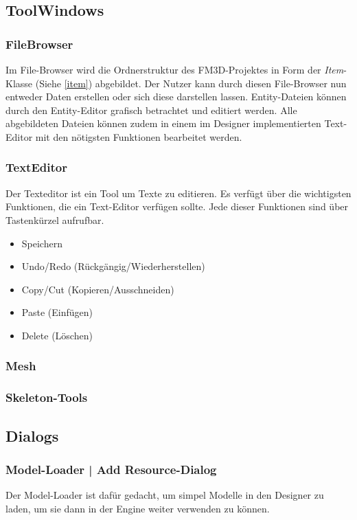 \subsection{ToolWindows}
\subsubsection{FileBrowser}
\label{filebrowser}
Im File-Browser wird die Ordnerstruktur des FM3D-Projektes in Form der \textit{Item}-Klasse (Siehe \cref{item}) abgebildet. Der Nutzer kann durch diesen File-Browser nun entweder Daten erstellen oder sich diese darstellen lassen. Entity-Dateien können durch den Entity-Editor grafisch betrachtet und editiert werden. Alle abgebildeten Dateien können zudem in einem im Designer implementierten Text-Editor mit den nötigsten Funktionen bearbeitet werden.

\subsubsection{TextEditor}
Der Texteditor ist ein Tool um Texte zu editieren.  Es verfügt über die wichtigsten Funktionen, die ein Text-Editor verfügen sollte. Jede dieser Funktionen sind über Tastenkürzel aufrufbar.
\begin{itemize}
	\item Speichern
	\item Undo/Redo (Rückgängig/Wiederherstellen)
	\item Copy/Cut (Kopieren/Ausschneiden)
	\item Paste (Einfügen)
	\item Delete (Löschen)
\end{itemize}

\subsubsection{Mesh}
\subsubsection{Skeleton-Tools}

\subsection{Dialogs}
\subsubsection{Model-Loader | Add Resource-Dialog}
Der Model-Loader ist dafür gedacht, um simpel Modelle in den Designer zu laden, um sie dann in der Engine weiter verwenden zu können.

